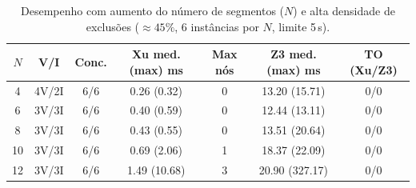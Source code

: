 \begin{table}[t]
\centering
\caption{Desempenho com aumento do n\'umero de segmentos ($N$) e alta densidade de exclus\~oes ($\approx 45\%$, 6 inst\^ancias por $N$, limite 5\,s).}
\label{tab:escalabilidade_segmentos}
\scriptsize
\begin{tabular}{ccccccc}
\hline
\textbf{$N$} & \textbf{V/I} & \textbf{Conc.} & \textbf{Xu med. (max) ms} & \textbf{Max n\'os} & \textbf{Z3 med. (max) ms} & \textbf{TO (Xu/Z3)} \\
\hline
4 & 4V/2I & 6/6 & 0.26 (0.32) & 0 & 13.20 (15.71) & 0/0 \\
6 & 3V/3I & 6/6 & 0.40 (0.59) & 0 & 12.44 (13.11) & 0/0 \\
8 & 3V/3I & 6/6 & 0.43 (0.55) & 0 & 13.51 (20.64) & 0/0 \\
10 & 3V/3I & 6/6 & 0.69 (2.06) & 1 & 18.37 (22.09) & 0/0 \\
12 & 3V/3I & 6/6 & 1.49 (10.68) & 3 & 20.90 (327.17) & 0/0 \\
\hline
\end{tabular}
\end{table}
